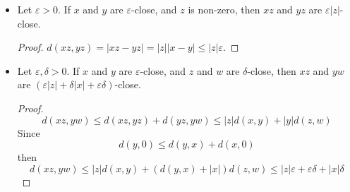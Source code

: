 \documentclass{blog}
\begin{document}
\begin{proposition}
\begin{itemize}
\begin{proof}
\begin{itemize}
      \item If $y < 0$, then $-y \leq -x < 0$, then $|y| \leq |x|$.
      \end{itemize}
    \end{proof}
    \begin{proof}
      Suppose $y \leq w \leq z$, then
      \begin{equation*}
        y - x \leq w - x \leq z - x
      \end{equation*}
      Then either
      \begin{equation*}
        |w-x|\leq |y-x|
      \end{equation*}
      or
      \begin{equation*}
        |w-x|\leq |z-x|
      \end{equation*}
      Then either
      \begin{equation*}
        d(w,x) \leq d(y,x) \leq \varepsilon
      \end{equation*}
      or
      \begin{equation*}
        d(w,x) \leq d(z,x) \leq \varepsilon
      \end{equation*}
    \end{proof}
  \item Let $\varepsilon > 0$. If $x$ and $y$ are $\varepsilon$-close, and $z$ is non-zero,
    then $x z$ and $y z$ are $\varepsilon|z|$-close.
    \begin{proof}
      $d(x z, y z) = |x z - y z| = |z| |x - y| \leq |z| \varepsilon$.
    \end{proof}
  \item Let $\varepsilon, \delta > 0$. If $x$ and $y$ are $\varepsilon$-close,
    and $z$ and $w$ are $\delta$-close,
    then $x z$ and $y w$ are $(\varepsilon |z| + \delta |x| + \varepsilon \delta)$-close.
    \begin{proof}
      \begin{equation*}
        d(x z, y w) \leq d(x z, y z) + d(y z, y w) \leq |z| d(x, y) + |y| d(z, w)
      \end{equation*}
      Since
      \begin{equation*}
        d(y, 0) \leq d(y, x) + d(x, 0)
      \end{equation*}
      then
      \begin{equation*}
        d(x z, y w) \leq |z| d(x, y) + (d(y, x) + |x|) d(z, w)
        \leq |z| \varepsilon + \varepsilon \delta + |x| \delta
      \end{equation*}
    \end{proof}
  \end{itemize}
\end{proposition}
\end{document}
